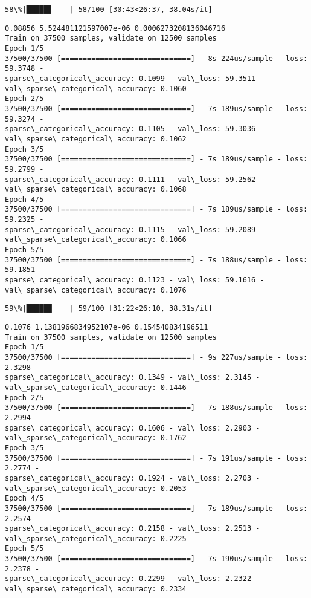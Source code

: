 \documentclass[11pt]{article}
\begin{document}
    \begin{Verbatim}[commandchars=\\\{\}]
 58\%|█████▊    | 58/100 [30:43<26:37, 38.04s/it]
    \end{Verbatim}

    \begin{Verbatim}[commandchars=\\\{\}]
0.08856 5.524481121597007e-06 0.0006273208136046716
Train on 37500 samples, validate on 12500 samples
Epoch 1/5
37500/37500 [==============================] - 8s 224us/sample - loss: 59.3748 -
sparse\_categorical\_accuracy: 0.1099 - val\_loss: 59.3511 -
val\_sparse\_categorical\_accuracy: 0.1060
Epoch 2/5
37500/37500 [==============================] - 7s 189us/sample - loss: 59.3274 -
sparse\_categorical\_accuracy: 0.1105 - val\_loss: 59.3036 -
val\_sparse\_categorical\_accuracy: 0.1062
Epoch 3/5
37500/37500 [==============================] - 7s 189us/sample - loss: 59.2799 -
sparse\_categorical\_accuracy: 0.1111 - val\_loss: 59.2562 -
val\_sparse\_categorical\_accuracy: 0.1068
Epoch 4/5
37500/37500 [==============================] - 7s 189us/sample - loss: 59.2325 -
sparse\_categorical\_accuracy: 0.1115 - val\_loss: 59.2089 -
val\_sparse\_categorical\_accuracy: 0.1066
Epoch 5/5
37500/37500 [==============================] - 7s 188us/sample - loss: 59.1851 -
sparse\_categorical\_accuracy: 0.1123 - val\_loss: 59.1616 -
val\_sparse\_categorical\_accuracy: 0.1076
    \end{Verbatim}

    \begin{Verbatim}[commandchars=\\\{\}]
 59\%|█████▉    | 59/100 [31:22<26:10, 38.31s/it]
    \end{Verbatim}

    \begin{Verbatim}[commandchars=\\\{\}]
0.1076 1.1381966834952107e-06 0.154540834196511
Train on 37500 samples, validate on 12500 samples
Epoch 1/5
37500/37500 [==============================] - 9s 227us/sample - loss: 2.3298 -
sparse\_categorical\_accuracy: 0.1349 - val\_loss: 2.3145 -
val\_sparse\_categorical\_accuracy: 0.1446
Epoch 2/5
37500/37500 [==============================] - 7s 188us/sample - loss: 2.2994 -
sparse\_categorical\_accuracy: 0.1606 - val\_loss: 2.2903 -
val\_sparse\_categorical\_accuracy: 0.1762
Epoch 3/5
37500/37500 [==============================] - 7s 191us/sample - loss: 2.2774 -
sparse\_categorical\_accuracy: 0.1924 - val\_loss: 2.2703 -
val\_sparse\_categorical\_accuracy: 0.2053
Epoch 4/5
37500/37500 [==============================] - 7s 189us/sample - loss: 2.2574 -
sparse\_categorical\_accuracy: 0.2158 - val\_loss: 2.2513 -
val\_sparse\_categorical\_accuracy: 0.2225
Epoch 5/5
37500/37500 [==============================] - 7s 190us/sample - loss: 2.2378 -
sparse\_categorical\_accuracy: 0.2299 - val\_loss: 2.2322 -
val\_sparse\_categorical\_accuracy: 0.2334
    \end{Verbatim}
\end{document}
